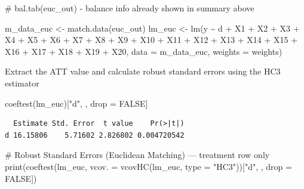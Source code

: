 \documentclass[
  letterpaper,
  DIV=11,
  numbers=noendperiod]{scrartcl}
\newenvironment{Shaded}{\begin{snugshade}}{\end{snugshade}}
\newcommand{\AttributeTok}[1]{\textcolor[rgb]{0.40,0.45,0.13}{#1}}
\newcommand{\CommentTok}[1]{\textcolor[rgb]{0.37,0.37,0.37}{#1}}
\newcommand{\ConstantTok}[1]{\textcolor[rgb]{0.56,0.35,0.01}{#1}}
\newcommand{\FunctionTok}[1]{\textcolor[rgb]{0.28,0.35,0.67}{#1}}
\newcommand{\NormalTok}[1]{\textcolor[rgb]{0.00,0.23,0.31}{#1}}
\newcommand{\OtherTok}[1]{\textcolor[rgb]{0.00,0.23,0.31}{#1}}
\newcommand{\SpecialCharTok}[1]{\textcolor[rgb]{0.37,0.37,0.37}{#1}}
\newcommand{\StringTok}[1]{\textcolor[rgb]{0.13,0.47,0.30}{#1}}
\begin{document}
\begin{Shaded}
\begin{Highlighting}[]
\CommentTok{\# bal.tab(euc\_out) {-} balance info already shown in summary above}

\NormalTok{m\_data\_euc }\OtherTok{\textless{}{-}} \FunctionTok{match.data}\NormalTok{(euc\_out)}
\NormalTok{lm\_euc }\OtherTok{\textless{}{-}} \FunctionTok{lm}\NormalTok{(y }\SpecialCharTok{\textasciitilde{}}\NormalTok{ d }\SpecialCharTok{+}\NormalTok{ X1 }\SpecialCharTok{+}\NormalTok{ X2 }\SpecialCharTok{+}\NormalTok{ X3 }\SpecialCharTok{+}\NormalTok{ X4 }\SpecialCharTok{+}\NormalTok{ X5 }\SpecialCharTok{+}\NormalTok{ X6 }\SpecialCharTok{+}\NormalTok{ X7 }\SpecialCharTok{+}\NormalTok{ X8 }\SpecialCharTok{+}\NormalTok{ X9 }\SpecialCharTok{+}\NormalTok{ X10 }\SpecialCharTok{+}\NormalTok{ X11 }\SpecialCharTok{+} 
\NormalTok{             X12 }\SpecialCharTok{+}\NormalTok{ X13 }\SpecialCharTok{+}\NormalTok{ X14 }\SpecialCharTok{+}\NormalTok{ X15 }\SpecialCharTok{+}\NormalTok{ X16 }\SpecialCharTok{+}\NormalTok{ X17 }\SpecialCharTok{+}\NormalTok{ X18 }\SpecialCharTok{+}\NormalTok{ X19 }\SpecialCharTok{+}\NormalTok{ X20, }
             \AttributeTok{data =}\NormalTok{ m\_data\_euc, }\AttributeTok{weights =}\NormalTok{ weights)}
\end{Highlighting}
\end{Shaded}

Extract the ATT value and calculate robust standard errors using the HC3
estimator

\begin{Shaded}
\begin{Highlighting}[]
\FunctionTok{coeftest}\NormalTok{(lm\_euc)[}\StringTok{"d"}\NormalTok{, , drop }\OtherTok{=} \ConstantTok{FALSE}\NormalTok{]}
\end{Highlighting}
\end{Shaded}

\begin{verbatim}
  Estimate Std. Error  t value    Pr(>|t|)
d 16.15806    5.71602 2.826802 0.004720542
\end{verbatim}

\begin{Shaded}
\begin{Highlighting}[]
\CommentTok{\# Robust Standard Errors (Euclidean Matching) — treatment row only}
\FunctionTok{print}\NormalTok{(}\FunctionTok{coeftest}\NormalTok{(lm\_euc, }\AttributeTok{vcov. =} \FunctionTok{vcovHC}\NormalTok{(lm\_euc, }\AttributeTok{type =} \StringTok{"HC3"}\NormalTok{))[}\StringTok{"d"}\NormalTok{, , }\AttributeTok{drop =} \ConstantTok{FALSE}\NormalTok{])}
\end{Highlighting}
\end{Shaded}
\end{document}
